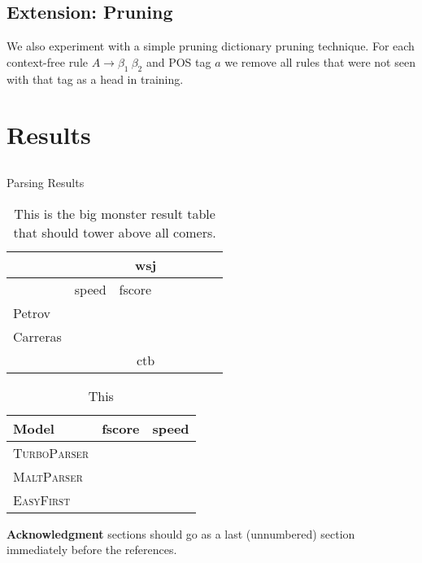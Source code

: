 \documentclass[11pt,letterpaper]{article}
\begin{document}


\subsection{Extension: Pruning}

We also experiment with a simple pruning dictionary pruning technique.
For each context-free rule $A \rightarrow \beta_1\ \beta_2$ and POS tag $a$ we
remove all rules that were not seen with that tag as a head in training.



\subsection{}

\section{Results}


\subsection{}


\begin{table*}
  \centering
  Parsing Results


  \begin{tabular}{l|lllllll}
    \hline
    & \multicolumn{7}{|c}{wsj} \\
    \hline
    & speed & fscore \\
    \hline
    Petrov & & & \\
    Carreras & & & \\
    \hline
    \hline
    & \multicolumn{7}{|c}{ctb} \\
    \hline
  \end{tabular}
  \caption{This is the big monster result table that should tower above all comers. }
\end{table*}

\begin{table}
  \centering
  \begin{tabular}{l|ll}
    Model & fscore & speed  \\
    \hline
    \textsc{TurboParser} & & \\
    \textsc{MaltParser} & & \\
    \textsc{EasyFirst} & & \\
  \end{tabular}
  \caption{This }
\end{table}

\textbf{Acknowledgment} sections should go as a last (unnumbered) section immediately
before the references.



\end{document}
